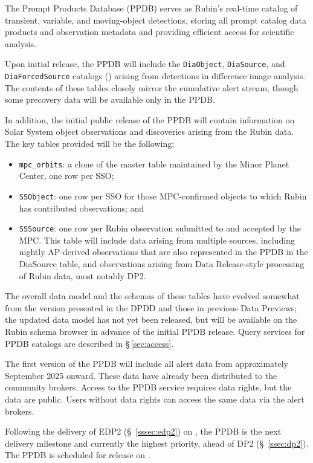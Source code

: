The Prompt Products Database (PPDB) serves as Rubin's real-time catalog of transient, variable, and moving-object detections, storing all prompt catalog data products and observation metadata and providing efficient access for scientific analysis.

Upon initial release, the PPDB will include the \texttt{DiaObject}, \texttt{DiaSource}, and \texttt{DiaForcedSource}
catalogs () arising from detections in difference image analysis.
The contents of these tables closely mirror the cumulative alert stream, though some precovery data will be available only in the PPDB.

In addition, the initial public release of the PPDB will contain information on Solar System object observations and discoveries arising from the Rubin data.
The key tables provided will be the following:
\begin{itemize}
  \item \texttt{mpc\_orbits}: a clone of the master table maintained by the Minor Planet Center, one row per SSO;
  \item \texttt{SSObject}: one row per SSO for those MPC-confirmed objects to which Rubin has contributed observations; and
  \item \texttt{SSSource}: one row per Rubin observation submitted to and accepted by the MPC.
    This table will include data arising from multiple sources, including nightly AP-derived observations that are also
    represented in the PPDB in the DiaSource table,
    and observations arising from Data Release-style processing of Rubin data, most notably DP2.
\end{itemize}
The overall data model and the schemas of these tables have evolved somewhat from the version presented in the DPDD and those in previous Data Previews;
the updated data model has not yet been released, but will be available on the Rubin schema browser in advance of the initial PPDB release.
Query services for PPDB catalogs are described in \S\,\ref{sec:access}.

The first version of the PPDB will include all alert data from approximately September 2025 onward.
These data have already been distributed to the community brokers.
Access to the PPDB service requires data rights, but the data are public.
Users without data rights can access the same data via the alert brokers.

Following the delivery of EDP2 (\S~\ref{sssec:edp2}) on \edptwodate, the PPDB is the next delivery milestone and currently the highest priority, ahead of DP2 (\S~\ref{ssec:dp2}).
The PPDB is scheduled for release on \ppdbdate.

